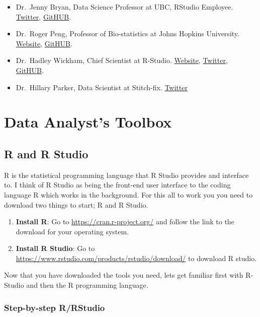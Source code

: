 \documentclass[]{book}
\providecommand{\tightlist}{%
  \setlength{\itemsep}{0pt}\setlength{\parskip}{0pt}}
\begin{document}
\begin{itemize}
\tightlist
\item
  Dr.~Jenny Bryan, Data Science Professor at UBC, RStudio Employee.
  \href{https://twitter.com/JennyBryan}{Twitter},
  \href{https://github.com/jennybc}{GitHUB}.
\item
  Dr.~Roger Peng, Professor of Bio-statistics at Johns Hopkins
  University. \href{http://www.biostat.jhsph.edu/~rpeng/}{Website},
  \href{https://github.com/rdpeng}{GitHUB}.
\item
  Dr.~Hadley Wickham, Chief Scientist at R-Studio.
  \href{http://hadley.nz/}{Website},
  \href{https://twitter.com/hadleywickham}{Twitter},
  \href{https://github.com/hadley}{GitHUB}.
\item
  Dr.~Hillary Parker, Data Scientist at Stitch-fix.
  \href{https://twitter.com/hspter}{Twitter}
\end{itemize}

\chapter{Data Analyst's Toolbox}\label{data-analysts-toolbox}

\section{R and R Studio}\label{r-and-r-studio}

R is the statistical programming language that R Studio provides and
interface to. I think of R Studio as being the front-end user interface
to the coding language R which works in the background. For this all to
work you you need to download two things to start; R and R Studio.

\begin{enumerate}
\def\labelenumi{\arabic{enumi})}
\tightlist
\item
  \textbf{Install R}: Go to \url{https://cran.r-project.org/} and follow
  the link to the download for your operating system.
\item
  \textbf{Install R Studio}: Go to
  \url{https://www.rstudio.com/products/rstudio/download/} to download R
  studio.
\end{enumerate}

Now that you have downloaded the tools you need, lets get familiar first
with R-Studio and then the R programming language.

\subsection{Step-by-step R/RStudio}\label{step-by-step-rrstudio}
\end{document}
